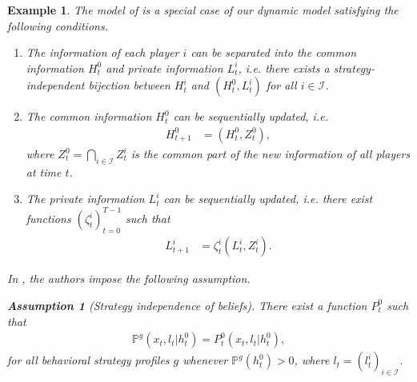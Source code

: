 \documentclass[pdflatex,sn-basic]{sn-jnl}
\renewcommand{\Pr}{\mathbb{P}}
\theoremstyle{thmstyleone}%
\theoremstyle{thmstyletwo}%
\newtheorem{assump}{Assumption}
\theoremstyle{thmstylethree}%
\newtheorem{example}{Example}
\begin{document}
\begin{example}\label{ex:nayyar}
	The model of \cite{nayyar2013common} is a special case of our dynamic model satisfying the following conditions.
	\begin{enumerate}[(1)]
		\item The information of each player $i$ can be separated into the common information $H_t^0$ and private information $L_t^i$, i.e. there exists a strategy-independent bijection between $H_t^i$ and $(H_t^0, L_t^i)$ for all $i\in\mathcal{I}$. 
		\item The common information $H_t^0$ can be sequentially updated, i.e.
		\begin{align}
			H_{t+1}^0 &= (H_t^0, Z_t^0),
		\end{align}
		where $Z_t^0 = \bigcap_{i\in\mathcal{I}} Z_t^i$ is the common part of the new information of all players at time $t$.
		
		\item The private information $L_t^i$ can be sequentially updated, i.e. there exist functions $(\zeta_t^i)_{t=0}^{T-1}$ such that
		\begin{align}
			L_{t+1}^i &= \zeta_t^i(L_t^i, Z_t^i).
		\end{align}
	\end{enumerate}

	In \cite{nayyar2013common}, the authors impose the following assumption.
	\begin{assump}[Strategy independence of beliefs]\label{assump:cibstraindep}
		There exist a function $P_t^0$ such that
		\begin{align}
			\Pr^{g}(x_t, l_t|h_t^0) = P_t^0(x_t, l_t|h_t^0),
		\end{align}
		for all behavioral strategy profiles $g$ whenever $\Pr^g(h_t^0) > 0$, where $l_t=(l_t^i)_{i\in\mathcal{I}}$.
	\end{assump}
	

\end{example}
\end{document}
